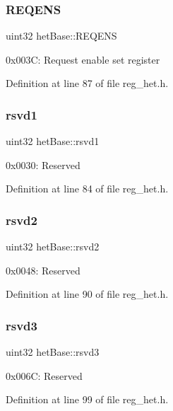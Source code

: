 \subsubsection{\texorpdfstring{R\+E\+Q\+E\+NS}{REQENS}}
{\footnotesize\ttfamily uint32 het\+Base\+::\+R\+E\+Q\+E\+NS}

0x003C\+: Request enable set register 

Definition at line 87 of file reg\+\_\+het.\+h.

\mbox{\label{structhetBase_aa476ef119c0d3b46c8f42b9069486aa0}} 
\subsubsection{\texorpdfstring{rsvd1}{rsvd1}}
{\footnotesize\ttfamily uint32 het\+Base\+::rsvd1}

0x0030\+: Reserved 

Definition at line 84 of file reg\+\_\+het.\+h.

\mbox{\label{structhetBase_a16cd4a3456dc5a5ce100328925248e50}} 
\subsubsection{\texorpdfstring{rsvd2}{rsvd2}}
{\footnotesize\ttfamily uint32 het\+Base\+::rsvd2}

0x0048\+: Reserved 

Definition at line 90 of file reg\+\_\+het.\+h.

\mbox{\label{structhetBase_a400af06786ee8472e72dbe1ededae12e}} 
\subsubsection{\texorpdfstring{rsvd3}{rsvd3}}
{\footnotesize\ttfamily uint32 het\+Base\+::rsvd3}

0x006C\+: Reserved 

Definition at line 99 of file reg\+\_\+het.\+h.

\mbox{\label{structhetBase_a4454e67217eef033f4dcf8e3d7715cc1}} 
